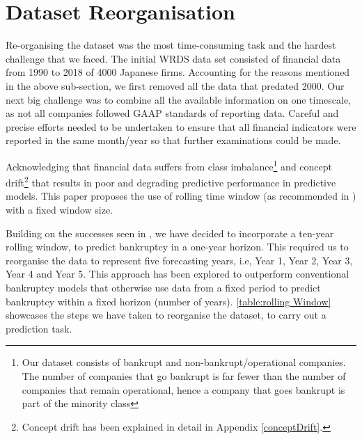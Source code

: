 \section{Dataset Reorganisation}
Re-organising the dataset was the most time-consuming task and the hardest challenge that we faced. The initial WRDS data set consisted of financial data from 1990 to 2018 of 4000 Japanese firms. Accounting for the reasons mentioned in the above sub-section, we first removed all the data that predated 2000. 
Our next big challenge was to combine all the available information on one timescale, as not all companies followed GAAP standards of reporting data. Careful and precise efforts needed to be undertaken to ensure that all financial indicators were reported in the same month/year so that further examinations could be made.

Acknowledging that financial data suffers from class imbalance\footnote{Our dataset consists of bankrupt and non-bankrupt/operational companies. The number of companies that go bankrupt is far fewer than the number of companies that remain operational, hence a company that goes bankrupt is part of the minority class} and concept drift\footnote{Concept drift has been explained in detail in Appendix \autoref{conceptDrift}.} that results in poor and degrading predictive performance in predictive models.  This paper proposes the use of rolling time window (as recommended in \cite{molodtsova2009out,huang2012dynamic,stock2007has}) with a fixed window size. 


Building on the successes seen in \cite{matsunaga2019exploring,li2019dp,molodtsova2009out}, we have decided to incorporate a ten-year rolling window, to predict bankruptcy in a one-year horizon. This required us to reorganise the data to represent five forecasting years, i.e, Year 1, Year 2, Year 3, Year 4 and Year 5. This approach has been explored to outperform conventional bankruptcy models that otherwise use data from a fixed period to predict bankruptcy within a fixed horizon (number of years). \autoref{table:rolling Window} showcases the steps we have taken to reorganise the dataset, to carry out a prediction task.

